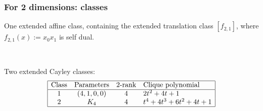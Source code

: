 \documentclass[pdf,sprung,slideColor,nocolorBG]{beamer}
\newenvironment{colortheme}[1]{
\def\ProvidesPackageRCS $##1${\relax}
\renewcommand{\ProcessOptions}{\relax}
\makeatletter

\makeatother
}{}
\begin{document}
\begin{colortheme}{jubata}

\begin{frame}
\frametitle{For 2 dimensions: classes}

One extended affine class, containing the extended translation class $[f_{2,1}]$,
where $f_{2,1}(x) := x_0 x_1$ is self dual.

~

Two extended Cayley classes:
\begin{align*}
\begin{array}{|cccl|}
\hline
\text{Class} &
\text{Parameters} &
\text{2-rank} &
\text{Clique polynomial}
\\
\hline
1 &
(4, 1, 0, 0) & 4 &
2t^{2} + 4t + 1
\\
2 &
K_4 & 4 &
t^{4} + 4t^{3} + 6t^{2} + 4t + 1
\\
\hline
\end{array}
\end{align*}


\end{frame}
\end{colortheme}
\end{document}
